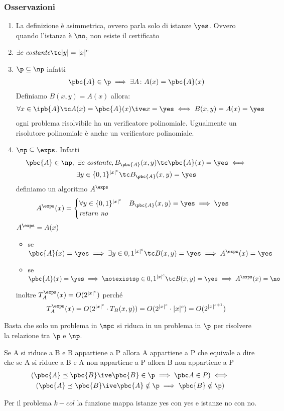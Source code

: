 \subsubsection{Osservazioni}
\begin{enumerate}
	\item La definizione è asimmetrica, ovvero parla solo di istanze $\yes$. Ovvero quando l'istanza è $\no$, non esiste il certificato
	\item $\exists c\ \textit{costante}\tc |y|=|x|^c$
	\item $\p\subseteq \np$ infatti
	\begin{gather*}
		\pbc{A}\in \p\implies \exists A\colon A(x)=\pbc{A}(x)
	\end{gather*}
	Definiamo $B(x,y)=A(x)$ allora:
	\begin{gather*}
		\forall x \in \ipb{A}\tc A(x)=\pbc{A}(x)\ive x=\yes\iff B(x,y)=A(x)=\yes
 	\end{gather*}
 	ogni problema risolvibile ha un verificatore polinomiale. Ugualmente un risolutore polinomiale è anche un verificatore polinomiale.
 	\item $\np\subseteq\exps$. Infatti 
 	\begin{gather*}
 		\pbc{A} \in \np,\ \exists c\ \textit{costante}, B_\pbc{A}(x,y)\tc \pbc{A}(x)=\yes\iff \\\exists y \in \{0,1\}^{|x|^c} \tc B_\pbc{A}(x,y)=\yes
 	\end{gather*}
 	definiamo un algoritmo $A^\exps$
 	\begin{gather*}
 		A^{\exps}(x) = \begin{cases}
 			\forall y\in \{0,1\}^{|x|^c}\quad B_\pbc{A}(x,y)=\yes \implies \yes
 			\\
 			\textit{return no}
 		\end{cases}
 	\end{gather*}
 	$A^\exps=A(x)$
 	\begin{itemize}
 		\item se $\pbc{A}(x)=\yes \implies \exists y\in {0,1}^{|x|^c}\tc B(x,y)=\yes \implies A^{\exps}(x)=\yes$
 		\item se $\pbc{A}(x)=\yes \implies \notexists y\in {0,1}^{|x|^c}\tc B(x,y)=\yes \implies A^{\exps}(x)=\no$
 	\end{itemize}
 	inoltre $T_A^\exps(x)=O(2^{|x|^c})$ perché \[T_A^\exps(x)=O(2^{|x|^c}\cdot T_B(x,y) )=O(2^{|x|^c}\cdot |x|^c)=O(2^{|x|^{c+1}})\]
\end{enumerate}

Basta che solo un problema in $\npc$ si riduca in un problema in $\p$ per risolvere la relazione tra $\p$ e $\np$. 

Se A si riduce a B e B appartiene a P allora A appartiene a P che equivale a dire che se A si riduce a B e A non appartiene a P allora B non appartiene a P
\begin{gather*}
	(\pbc{A}\preceq\pbc{B}\ive \pbc{B}\in\p\implies \pbc A\in P)\iff\\
	(\pbc{A}\preceq\pbc{B}\ive \pbc{A}\notin\p\implies\pbc{B}\notin \p)
\end{gather*}

Per il problema $k-col$ la funzione mappa istanze yes con yes e istanze no con no.
